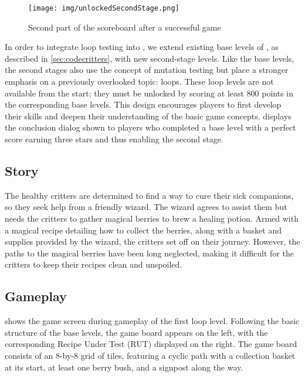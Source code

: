 \begin{figure}
	\centering
	\texttt{[image: img/unlockedSecondStage.png]}
	\caption{Second part of the scoreboard after a successful game}
	\label{fig:baseScoreDialogUnlockedSecond}
\end{figure}


In order to integrate loop testing into \toolname, we extend existing
base levels of \toolname, as described in \cref{sec:codecritters},
with new second-stage levels. Like the base levels, the second stages
also use the concept of mutation testing but place a stronger emphasis
on a previously overlooked topic: loops. These loop levels are not
available from the start; they must be unlocked by scoring at least
800 points in the corresponding base levels. This design encourages
players to first develop their skills and deepen their understanding
of the basic game concepts. 
displays the conclusion dialog shown to players who completed a base
level with a perfect score earning three stars and thus enabling the
second stage.


\subsection{Story}

The healthy critters are determined to find a way to cure their sick companions, so they seek help from a friendly wizard. The wizard agrees to assist them but needs the critters to gather magical berries to brew a healing potion. Armed with a magical recipe detailing how to collect the berries, along with a basket and supplies provided by the wizard, the critters set off on their journey. However, the paths to the magical berries have been long neglected, making it difficult for the critters to keep their recipes clean and unspoiled.

\subsection{Gameplay}

 shows the game screen during gameplay of the first loop level. Following the basic structure of the base levels, the game board appears on the left, with the corresponding Recipe Under Test (RUT) displayed on the right. The game board consists of an 8-by-8 grid of tiles, featuring a cyclic path with a collection basket at its start, at least one berry bush, and a signpost along the way. 

